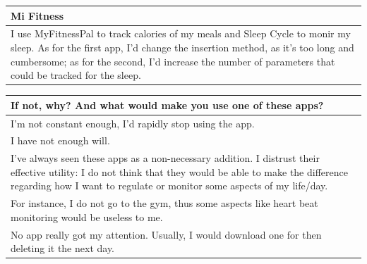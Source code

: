 \documentclass{article}
\begin{document}
\begin{table}[H]
\begin{tabularx}{0.9\textwidth}{X}
		\hline
		Mi Fitness                                                                                                                                                                                                                                                                 \\
		\hline
		I use MyFitnessPal to track calories of my meals and Sleep Cycle to monir my sleep. As for the first app, I'd change the insertion method, as it's too long and cumbersome; as for the second, I'd increase the number of parameters that could be tracked for the sleep.  \\
		\hline
	\end{tabularx}
\end{table}

\begin{table}[H]
	\centering
	\begin{tabularx}{0.9\textwidth}{X}
		\hline
		\textbf{If not, why? And what would make you use one of these apps?}                                                                                                                                                                \\
		\hline
		I'm not constant enough, I'd rapidly stop using the app.                                                                                                                                                                            \\
		\hline
		I have not enough will.                                                                                                                                                                                                             \\
		\hline
		I've always seen these apps as a non-necessary addition. I distrust their effective utility: I do not think that they would be able to make the difference regarding how I want to regulate or monitor some aspects of my life/day. \\
		\hline
		For instance, I do not go to the gym, thus some aspects like heart beat monitoring would be useless to me.                                                                                                                          \\
		\hline
		No app really got my attention. Usually, I would download one for then deleting it the next day.                                                                                                                                    \\

\end{tabularx}
\end{table}
\end{document}
